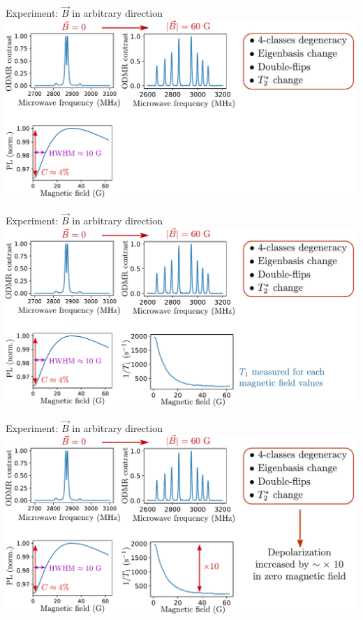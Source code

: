 \documentclass{beamer}
\begin{document}
\begin{frame}{Experiment: $\vec B$ in arbitrary direction}
\centering
\includegraphics[width=\textwidth,height=0.85\textheight,keepaspectratio]{Slide_T1_PL_1x1x1x1_f-2}
\end{frame}

\begin{frame}{Experiment: $\vec B$ in arbitrary direction}
\centering
\includegraphics[width=\textwidth,height=0.85\textheight,keepaspectratio]{Slide_T1_PL_1x1x1x1_f-1}
\end{frame}

\begin{frame}{Experiment: $\vec B$ in arbitrary direction}
\centering
\includegraphics[width=\textwidth,height=0.85\textheight,keepaspectratio]{Slide_T1_PL_1x1x1x1_f}
\end{frame}
\end{document}
